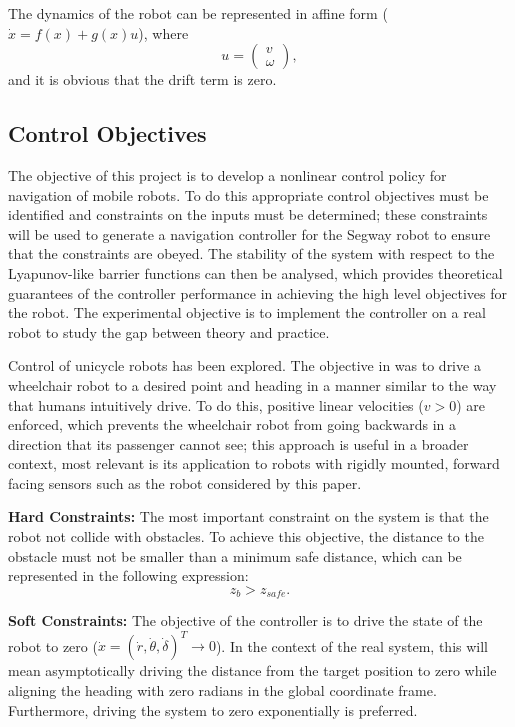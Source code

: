 \documentclass[journal]{IEEEtran}
\begin{document}
The dynamics of the robot can be represented in affine form ($\dot{x}=f(x)+g(x)u$), where \begin{equation}u=\left(\begin{matrix}
v\\\omega \end{matrix}\right),\end{equation} and it is obvious that the drift term is zero. 

\subsection{Control Objectives}
The objective of this project is to develop a nonlinear control policy for navigation of mobile robots. To do this appropriate control objectives must be identified and constraints on the inputs must be determined; these constraints will be used to generate a navigation controller for the Segway robot to ensure that the constraints are obeyed. The stability of the system with respect to the Lyapunov-like barrier functions can then be analysed, which provides theoretical guarantees of the controller performance in achieving the high level objectives for the robot. The experimental objective is to implement the controller on a real robot to study the gap between theory and practice.

Control of unicycle robots has been explored. The objective in \cite{park2011} was to drive a wheelchair robot to a desired point and heading in a manner similar to the way that humans intuitively drive. To do this, positive linear velocities ($v>0$) are enforced, which prevents the wheelchair robot from going backwards in a direction that its passenger cannot see; this approach is useful in a broader context, most relevant is its application to robots with rigidly mounted, forward facing sensors such as the robot considered by this paper.

\textbf{Hard Constraints:} The most important constraint on the system is that the robot not collide with obstacles. To achieve this objective, the distance to the obstacle must not be smaller than a minimum safe distance, which can be represented in the following expression:
\begin{equation}
z_b>z_{safe}.
\end{equation}

\textbf{Soft Constraints:} The objective of the controller is to drive the state of the robot to zero ($\dot{x}=(\dot{r},\dot{\theta},\dot{\delta})^T \to 0$). In the context of the real system, this will mean asymptotically driving the distance from the target position to zero while aligning the heading with zero radians in the global coordinate frame. Furthermore, driving the system to zero exponentially is preferred.
\end{document}
